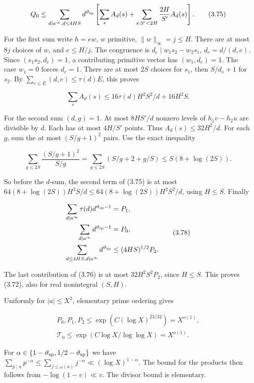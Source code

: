 \[
Q_0\le\sum_{d\mid a^\infty,d\le4HS}d^{\vartheta_{\rm sp}}
 \left[\sum_s A_d(s)+\sum_{s:S'<2H}\frac{2H}{S'}A_d(s)\right].
\tag{3.75}
\]

For the first sum write $h=e w$, $w$ primitive,
$\|w\|_\infty=j\le H$. There are at most $8j$ choices of $w$,
and $e\le H/j$. The congruence is
$d_e\mid w_1s_2-w_2s_1$, $d_e=d/(d,e)$.
Since $(s_1s_2,d_e)=1$, a contributing primitive vector has
$(w_1,d_e)=1$. The case $w_1=0$ forces $d_e=1$. There are at
most $2S$ choices for $s_1$, then $S/d_e+1$ for $s_2$.
By $\sum_{e\le E}(d,e)\le\tau(d)E$, this proves

\[
\sum_sA_d(s)\le16\tau(d)H^2S^2/d+16H^2S.
\tag{3.76}
\]

For the second sum $(d,g)=1$.
At most $8HS'/d$ nonzero levels of $h_1v-h_2u$ are divisible by $d$.
Each has at most $4H/S'$ points. Thus $A_d(s)\le32H^2/d$.
For each $g$, sum the at most $(S/g+1)^2$ pairs.
Use the exact inequality

\[
\sum_{g\le2S}\frac{(S/g+1)^2}{S/g}
 =\sum_{g\le2S}(S/g+2+g/S)\le S(8+\log(2S)).
\tag{3.77}
\]

So before the $d$-sum, the second term of (3.75) is at most
$64(8+\log(2S))H^3S/d\le64(8+\log(2S))H^2S^2/d$, using $H\le S$. Finally

\[
\begin{aligned}
\sum_{d\mid a^\infty}\tau(d)d^{\vartheta_{\rm sp}-1}&=P_1,\\
\sum_{d\mid a^\infty}d^{\vartheta_{\rm sp}-1}&=P_0,\\
\sum_{d\le4HS,d\mid a^\infty}d^{\vartheta_{\rm sp}}&\le(4HS)^{1/2}P_2.
\end{aligned}
\tag{3.78}
\]

The last contribution of (3.76) is at most $32H^2S^2P_2$, since
$H\le S$. This proves (3.72), also for real nonintegral $(S,H)$.

Uniformly for $|a|\le X^2$, elementary prime ordering gives

\[
\begin{gathered}
P_0,P_1,P_2\le\exp(C(\log X)^{23/32})=X^{o(1)},\\
\mathcal T_0\le\exp(C\log X/\log\log X)=X^{o(1)}.
\end{gathered}
\tag{3.79}
\]

For $\alpha\in\{1-\vartheta_{\rm sp},1/2-\vartheta_{\rm sp}\}$ we have
$\sum_{p\mid a}p^{-\alpha}\le
\sum_{j\le\omega(a)}j^{-\alpha}\ll(\log X)^{1-\alpha}$.
The bound for the products then follows from
$-\log(1-v)\ll v$. The divisor bound is elementary.

